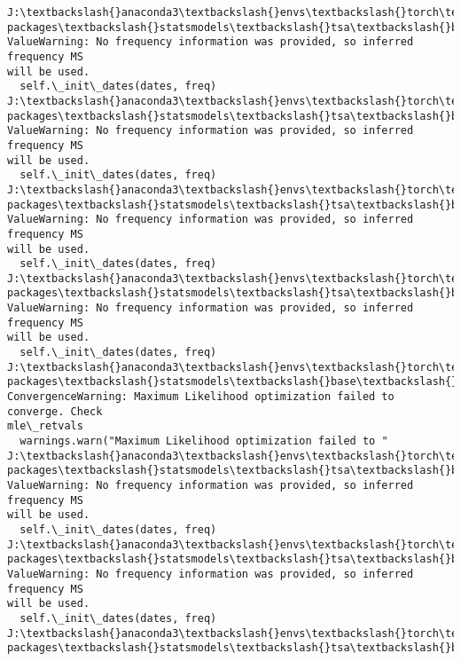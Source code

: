 \documentclass[11pt]{article}
\begin{document}
    \begin{Verbatim}[commandchars=\\\{\}]
J:\textbackslash{}anaconda3\textbackslash{}envs\textbackslash{}torch\textbackslash{}Lib\textbackslash{}site-packages\textbackslash{}statsmodels\textbackslash{}tsa\textbackslash{}base\textbackslash{}tsa\_model.py:473:
ValueWarning: No frequency information was provided, so inferred frequency MS
will be used.
  self.\_init\_dates(dates, freq)
J:\textbackslash{}anaconda3\textbackslash{}envs\textbackslash{}torch\textbackslash{}Lib\textbackslash{}site-packages\textbackslash{}statsmodels\textbackslash{}tsa\textbackslash{}base\textbackslash{}tsa\_model.py:473:
ValueWarning: No frequency information was provided, so inferred frequency MS
will be used.
  self.\_init\_dates(dates, freq)
J:\textbackslash{}anaconda3\textbackslash{}envs\textbackslash{}torch\textbackslash{}Lib\textbackslash{}site-packages\textbackslash{}statsmodels\textbackslash{}tsa\textbackslash{}base\textbackslash{}tsa\_model.py:473:
ValueWarning: No frequency information was provided, so inferred frequency MS
will be used.
  self.\_init\_dates(dates, freq)
J:\textbackslash{}anaconda3\textbackslash{}envs\textbackslash{}torch\textbackslash{}Lib\textbackslash{}site-packages\textbackslash{}statsmodels\textbackslash{}tsa\textbackslash{}base\textbackslash{}tsa\_model.py:473:
ValueWarning: No frequency information was provided, so inferred frequency MS
will be used.
  self.\_init\_dates(dates, freq)
J:\textbackslash{}anaconda3\textbackslash{}envs\textbackslash{}torch\textbackslash{}Lib\textbackslash{}site-packages\textbackslash{}statsmodels\textbackslash{}base\textbackslash{}model.py:607:
ConvergenceWarning: Maximum Likelihood optimization failed to converge. Check
mle\_retvals
  warnings.warn("Maximum Likelihood optimization failed to "
J:\textbackslash{}anaconda3\textbackslash{}envs\textbackslash{}torch\textbackslash{}Lib\textbackslash{}site-packages\textbackslash{}statsmodels\textbackslash{}tsa\textbackslash{}base\textbackslash{}tsa\_model.py:473:
ValueWarning: No frequency information was provided, so inferred frequency MS
will be used.
  self.\_init\_dates(dates, freq)
J:\textbackslash{}anaconda3\textbackslash{}envs\textbackslash{}torch\textbackslash{}Lib\textbackslash{}site-packages\textbackslash{}statsmodels\textbackslash{}tsa\textbackslash{}base\textbackslash{}tsa\_model.py:473:
ValueWarning: No frequency information was provided, so inferred frequency MS
will be used.
  self.\_init\_dates(dates, freq)
J:\textbackslash{}anaconda3\textbackslash{}envs\textbackslash{}torch\textbackslash{}Lib\textbackslash{}site-packages\textbackslash{}statsmodels\textbackslash{}tsa\textbackslash{}base\textbackslash{}tsa\_model.py:473:

\end{Verbatim}
\end{document}
